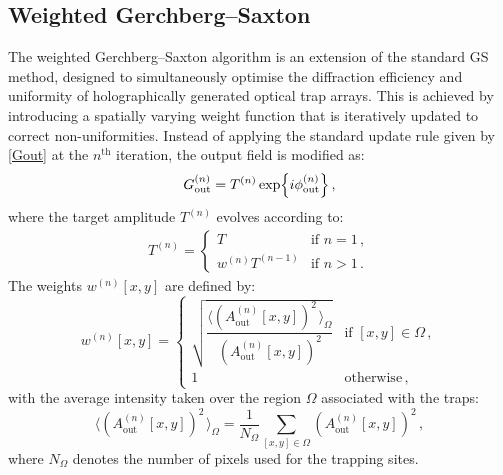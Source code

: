 \documentclass[../Thesis-IJspeert.tex]{subfiles}
\begin{document}
\subsection{Weighted Gerchberg--Saxton}
The weighted Gerchberg--Saxton algorithm is an extension of the standard GS method, designed to simultaneously optimise the diffraction efficiency and uniformity of holographically generated optical trap arrays. This is achieved by introducing a spatially varying weight function that is iteratively updated to correct non-uniformities. Instead of applying the standard update rule given by \autoref{Gout} at the $n^{\mathrm{th}}$ iteration, the output field is modified as:
\begin{equation}
\label{Gout2}
G_{\mathrm{out}}^{(n)} = T^{(n)} \exp\Bigl\{i \phi_{\mathrm{out}}^{(n)}\Bigr\}\,,
\end{equation}
where the target amplitude $T^{(n)}$ evolves according to:
\begin{align}
T^{(n)} =
\begin{cases}
T & \text{if } n=1\,, \\
w^{(n)} T^{(n-1)} & \text{if } n>1\,.
\end{cases}
\end{align}
The weights $w^{(n)}[x,y]$ are defined by:
\begin{equation}
w^{(n)}[x,y] = 
\begin{cases}
\sqrt{ \dfrac{\Big\langle \left(A_{\mathrm{out}}^{(n)}[x,y]\right)^{\!2\,} \Big\rangle_{\!\Omega}}{\left(A_{\mathrm{out}}^{(n)}[x,y]\right)^{\!2}} } & \text{if } [x,y] \in \Omega\,, \\
1 & \text{otherwise}\,,
\end{cases}
\end{equation}
with the average intensity taken over the region $\Omega$ associated with the traps:
\begin{equation}
\Big\langle \left(A_{\mathrm{out}}^{(n)}[x,y]\right)^{\!2\,} \Big\rangle_{\!\Omega} = \frac{1}{N_\Omega} \sum_{[x,y]\in\Omega} \left(A_{\mathrm{out}}^{(n)}[x,y]\right)^{\!2}\,,
\end{equation}
where $N_\Omega$ denotes the number of pixels used for the trapping sites.
\end{document}
